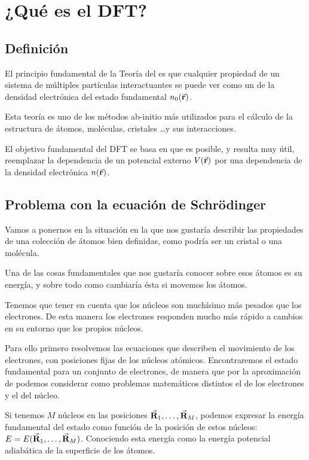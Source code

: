 \section{¿Qué es el DFT?}

\subsection{Definición}

El principio fundamental de la Teoría del  es que cualquier propiedad de un sistema de múltiples partículas interactuantes se puede ver como un  de la densidad electrónica del estado fundamental $n_0 (\va{r})$.

Esta teoría es uno de los métodos ab-initio más utilizados para el cálculo de la estructura de átomos, moléculas, cristales \dots y sus interacciones.

El objetivo fundamental del DFT se basa en que es posible, y resulta muy útil, reemplazar la dependencia de un potencial externo $V(\va{r})$ por una dependencia de la densidad electrónica $n(\va{r})$.

\subsection{Problema con la ecuación de Schrödinger} 

Vamos a ponernos en la situación en la que nos gustaría describir las propiedades de una colección de átomos bien definidas, como podría ser un cristal o una molécula.

Una de las cosas fundamentales que nos gustaría conocer sobre esos átomos es su energía, y sobre todo como cambiaría ésta si movemos los átomos.

Tenemos que tener en cuenta que los núcleos son muchísimo más pesados que los electrones. De esta manera los electrones responden mucho más rápido a cambios en su entorno que los propios núcleos.

Para ello primero resolvemos las ecuaciones que describen el movimiento de los electrones, con posiciones fijas de los núcleos atómicos. Encontraremos el estado fundamental para un conjunto de electrones, de manera que por la aproximación de  podemos considerar como problemas matemáticos distintos el de los electrones y el del núcleo.

Si tenemos $M$ núcleos en las posiciones $\va{R}_1 , \dots , \va{R}_M$, podemos expresar la energía fundamental del estado como función de la posición de estos núcleos: $E = E(\va{R}_1 , \dots , \va{R}_M)$. Conociendo esta energía como la energía potencial adiabática de la superficie de los átomos.

